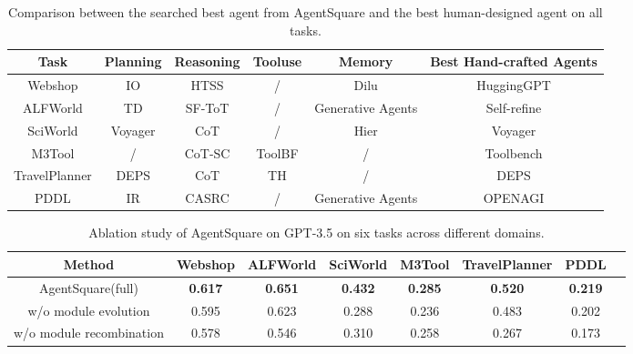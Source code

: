 \setlength{\tabcolsep}{1.mm}         
\begin{table}[t!]
    \centering
    \begin{tabular}{ccccc|c}
    \hline
    \textbf{Task} & \textbf{Planning} & \textbf{Reasoning} & \textbf{Tooluse} & \textbf{Memory} & \textbf{Best Hand-crafted Agents} \\ \hline
    Webshop & IO & HTSS & / & Dilu & HuggingGPT \\ \hline
    ALFWorld & TD & SF-ToT & / & Generative Agents& Self-refine \\ \hline
    SciWorld & Voyager& CoT& / & Hier& Voyager\\ \hline
    M3Tool & / & CoT-SC & ToolBF & / & Toolbench \\ \hline
    TravelPlanner & DEPS & CoT & TH & / & DEPS \\ \hline
    PDDL & IR & CASRC & / & Generative Agents& OPENAGI \\ \hline
    \end{tabular}
    {\caption{Comparison between the searched best agent from AgentSquare and the best human-designed agent on all tasks.}
    \label{tab:module}}
\end{table}

\setlength{\tabcolsep}{1mm} 
\begin{table}[t!]
    \centering
    \begin{tabular}{cccccccc}
    \hline
    \textbf{Method} & \multicolumn{1}{c}{\textbf{Webshop}} & \multicolumn{1}{c}{\textbf{ALFWorld}} & \multicolumn{1}{c}{\textbf{SciWorld}} & \multicolumn{1}{c}{\textbf{M3Tool}} & \multicolumn{1}{c}{\textbf{TravelPlanner}}  
     & \multicolumn{1}{c}{\textbf{PDDL}}\\
    \hline
    AgentSquare(full) & \textbf{0.617} & \textbf{0.651} & \textbf{0.432} & \textbf{0.285} & \textbf{0.520} & \textbf{0.219} \\ 
    w/o module evolution& 0.595 & 0.623 &0.288 & 0.236 & 0.483 & 0.202 \\
    w/o module recombination& 0.578 & 0.546 &0.310& 0.258 & 0.267&0.173 \\
    \hline
    \end{tabular}
    {\caption{Ablation study of AgentSquare on GPT-3.5 on six tasks across different domains.}
    \label{tab:ab1}}
\end{table}

